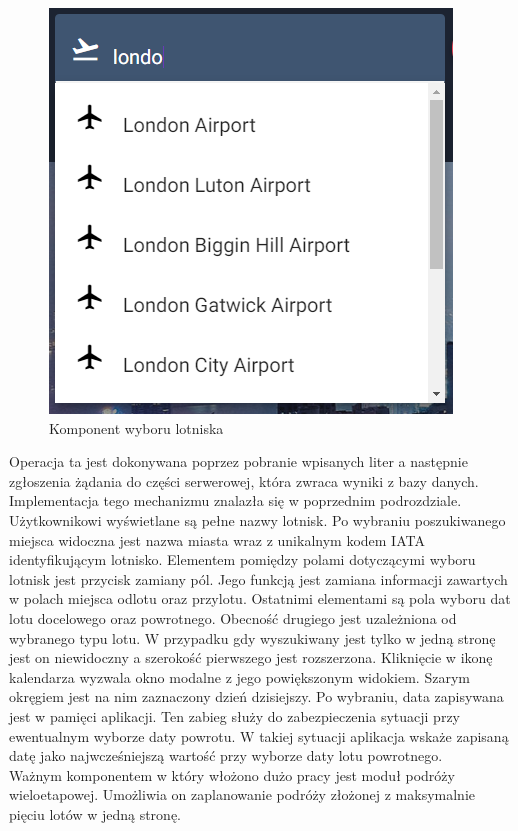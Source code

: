 \documentclass[12pt, twoside]{report}
\begin{document}
\begin{figure}[!ht]
\centering
\includegraphics[scale=0.8, keepaspectratio]{airport_choose.png}
\caption{Komponent wyboru lotniska}
\label{fig:airport_choose}
\end{figure}

Operacja ta jest dokonywana poprzez pobranie wpisanych liter a następnie zgłoszenia żądania do części serwerowej, która zwraca wyniki z bazy danych. Implementacja tego mechanizmu znalazła się w poprzednim podrozdziale. Użytkownikowi wyświetlane są pełne nazwy lotnisk. Po wybraniu poszukiwanego miejsca widoczna jest nazwa miasta wraz z unikalnym kodem IATA identyfikującym lotnisko. Elementem pomiędzy polami dotyczącymi wyboru lotnisk jest przycisk zamiany pól. Jego funkcją jest zamiana informacji zawartych w polach miejsca odlotu oraz przylotu. Ostatnimi elementami są pola wyboru dat lotu docelowego oraz powrotnego. Obecność drugiego jest uzależniona od wybranego typu lotu. W przypadku gdy wyszukiwany jest tylko w jedną stronę jest on niewidoczny a szerokość pierwszego jest rozszerzona. Kliknięcie w ikonę kalendarza wyzwala okno modalne z jego powiększonym widokiem. Szarym okręgiem jest na nim zaznaczony dzień dzisiejszy. Po wybraniu, data zapisywana jest w pamięci aplikacji. Ten zabieg służy do zabezpieczenia sytuacji przy ewentualnym wyborze daty powrotu. W takiej sytuacji aplikacja wskaże zapisaną datę jako najwcześniejszą wartość przy wyborze daty lotu powrotnego. \\ \indent
Ważnym komponentem w który włożono dużo pracy jest moduł podróży wieloetapowej. Umożliwia on zaplanowanie podróży złożonej z maksymalnie pięciu lotów w jedną stronę.
\end{document}
